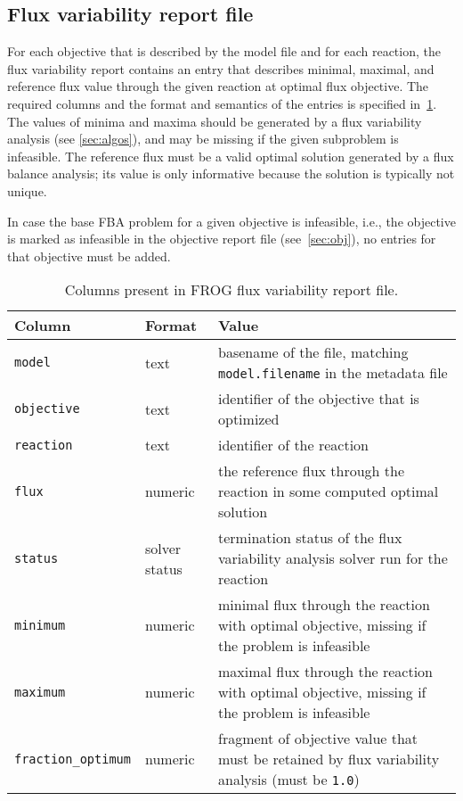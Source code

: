 \subsection{Flux variability report file}
\label{sec:fva}
For each objective that is described by the model file and for each reaction, the flux variability report contains an entry that describes minimal, maximal, and reference flux value through the given reaction at optimal flux objective. The required columns and the format and semantics of the entries is specified in~\cref{tab:fvafields}. The values of minima and maxima should be generated by a flux variability analysis (see \cref{sec:algos}), and may be missing if the given subproblem is infeasible. The reference flux must be a valid optimal solution generated by a flux balance analysis; its value is only informative because the solution is typically not unique.

In case the base FBA problem for a given objective is infeasible, i.e., the objective is marked as infeasible in the objective report file (see~\cref{sec:obj}), no entries for that objective must be added.



\begin{table}\tablefont
\begin{tabular}{llp{30em}}
\toprule
Column & Format & Value \\
\midrule
\verb|model|
 & text
 & basename of the file, matching \verb|model.filename| in the metadata file
 \\
\verb|objective|
 & text
 & identifier of the objective that is optimized
 \\
\verb|reaction|
 & text
 & identifier of the reaction
 \\
\verb|flux|
 & numeric
 & the reference flux through the reaction in some computed optimal solution
 \\
\verb|status|
 & solver status
 & termination status of the flux variability analysis solver run for the reaction
 \\
\verb|minimum|
 & numeric
 & minimal flux through the reaction with optimal objective, missing if the problem is infeasible
 \\
\verb|maximum|
 & numeric
 & maximal flux through the reaction with optimal objective, missing if the problem is infeasible
 \\
\verb|fraction_optimum|
 & numeric
 & fragment of objective value that must be retained by flux variability analysis (must be \verb|1.0|)
 \\
\bottomrule
\end{tabular}
\caption{Columns present in FROG flux variability report file.}
\label{tab:fvafields}
\end{table}

